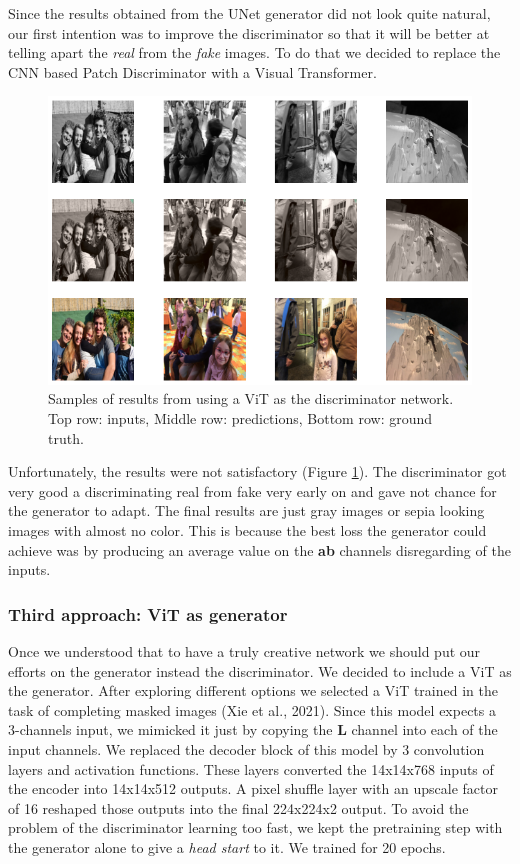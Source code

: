 \documentclass[
]{article}
\begin{document}
Since the results obtained from the UNet generator did not look quite
natural, our first intention was to improve the discriminator so that it
will be better at telling apart the \emph{real} from the \emph{fake}
images. To do that we decided to replace the CNN based Patch
Discriminator with a Visual Transformer.

\begin{figure}
\centering
\includegraphics{results/ViTasDiscriminator.png}
\caption{Samples of results from using a ViT as the discriminator
network. Top row: inputs, Middle row: predictions, Bottom row: ground
truth.}
\label{fig:ViT-discriminator-results}
\end{figure}

Unfortunately, the results were not satisfactory (Figure \ref{fig:ViT-discriminator-results}). The discriminator got
very good a discriminating real from fake very early on and gave not
chance for the generator to adapt. The final results are just gray
images or sepia looking images with almost no color. This is because the
best loss the generator could achieve was by producing an average value
on the \textbf{ab} channels disregarding of the inputs.

\hypertarget{third-approach-vit-as-generator}{%
\subsubsection{Third approach: ViT as
generator}\label{third-approach-vit-as-generator}}

Once we understood that to have a truly creative network we should put
our efforts on the generator instead the discriminator. We decided to
include a ViT as the generator. After exploring different options we
selected a ViT trained in the task of completing masked images (Xie et
al., 2021). Since this model expects a 3-channels input, we mimicked it
just by copying the \textbf{L} channel into each of the input channels.
We replaced the decoder block of this model by 3 convolution layers and
activation functions. These layers converted the 14x14x768 inputs of the
encoder into 14x14x512 outputs. A pixel shuffle layer with an upscale
factor of 16 reshaped those outputs into the final 224x224x2 output. To
avoid the problem of the discriminator learning too fast, we kept the
pretraining step with the generator alone to give a \emph{head start} to
it. We trained for 20 epochs.
\end{document}
